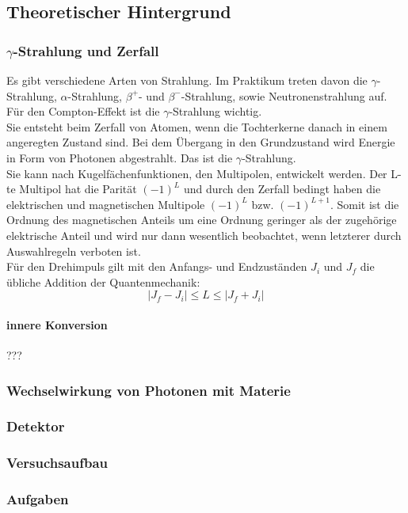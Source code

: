 \subsection{Theoretischer Hintergrund}
\subsubsection{$\gamma$-Strahlung und Zerfall}
Es gibt verschiedene Arten von Strahlung. Im Praktikum treten davon die $\gamma$-Strahlung, $\alpha$-Strahlung, $\beta^{+}$- und $\beta^{-}$-Strahlung, sowie Neutronenstrahlung auf. Für den Compton-Effekt ist die $\gamma$-Strahlung wichtig. \\
Sie entsteht beim Zerfall von Atomen, wenn die Tochterkerne danach in einem angeregten Zustand sind. Bei dem Übergang in den Grundzustand wird Energie in Form von Photonen abgestrahlt. Das ist die $\gamma$-Strahlung. \\
Sie kann nach Kugelfächenfunktionen, den Multipolen, entwickelt werden. Der L-te Multipol hat die Parität $(-1)^{L}$ und durch den Zerfall bedingt haben die elektrischen und magnetischen Multipole $(-1)^{L}$ bzw. $(-1)^{L+1}$. Somit ist die Ordnung des magnetischen Anteils um eine Ordnung geringer als der zugehörige elektrische Anteil und wird nur dann wesentlich beobachtet, wenn letzterer durch Auswahlregeln verboten ist. \\
Für den Drehimpuls gilt mit den Anfangs- und Endzuständen $J_i$ und $J_f$ die übliche Addition der Quantenmechanik:
$$\vert J_f - J_i \vert \leq L \leq \vert J_f + J_i \vert $$


\paragraph{innere Konversion} ???

\subsubsection{Wechselwirkung von Photonen mit Materie}

\subsubsection{Detektor}

\subsubsection{Versuchsaufbau}

\subsubsection{Aufgaben}
